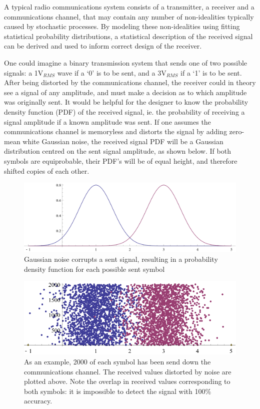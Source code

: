 A typical radio communications system consists of a transmitter, a
receiver and a communications channel, that may contain any number of
non-idealities typically caused by stochastic processes. By modeling these non-idealities using fitting statistical probability distributions, a statistical description of the received signal can be derived and used to inform correct design of the receiver.

One could imagine a binary transmission system that sends one of two
possible signals: a 1V$_{RMS}$ wave if a `0' is to be sent, and a
3V$_{RMS}$ if a `1' is to be sent. After being distorted by the
communications channel, the receiver could in theory see a signal of any
amplitude, and must make a decision as to which amplitude was originally
sent. It would be helpful for the designer to know the probability density function (PDF)
of the received signal, ie. the probability of receiving a signal
amplitude if a known amplitude was sent. If one assumes the communications
channel is memoryless and distorts the signal by adding zero-mean white Gaussian noise,
the received signal PDF will be a Gaussian distribution centred on the
sent signal amplitude, as shown below. If both symbols are equiprobable, their PDF's will be of equal height, and therefore shifted copies of each other.

\begin{figure}[htbp]
\centering
\includegraphics[width=\linewidth]{4-PAM_PDF.png}
\caption{Gaussian noise corrupts a sent signal, resulting in a
probability density function for each possible sent symbol}
\end{figure}

\begin{figure}[htbp]
\centering
\includegraphics[width=\linewidth]{4-PAM_samples.png}
\caption{As an example, 2000 of each symbol has been send down the
communications channel. The received values distorted by noise are
plotted above. Note the overlap in received values corresponding to both
symbols: it is impossible to detect the signal with 100\% accuracy.}
\end{figure}

